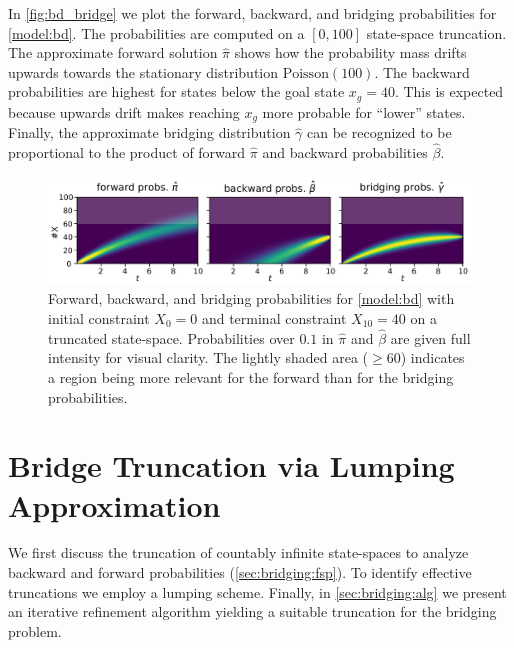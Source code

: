 \begin{example}
  In \autoref{fig:bd_bridge} we plot the forward, backward, and
  bridging probabilities for \autoref{model:bd}.
  The probabilities are computed on a $[0,100]$ state-space truncation.
  The approximate forward solution $\hat\pi$ shows how the
  probability mass drifts upwards towards the stationary distribution
  $\text{Poisson}(100)$. The backward probabilities are highest for
  states below the goal state $x_g=40$.
  This is expected because upwards drift makes reaching $x_g$ more
  probable for ``lower'' states.
  Finally, the approximate bridging distribution $\hat\gamma$ can be
  recognized to be proportional to the product of forward $\hat\pi$
  and backward probabilities $\hat\beta$.
  \begin{figure}[htb]
    \centering
    \includegraphics[width=\textwidth]{gfx/bridging_bd.pdf}
    \caption[Forward, backward, and bridging probabilities for
    \autoref{model:bd}]{Forward, backward, and bridging probabilities
      for \autoref{model:bd} with initial constraint $X_0=0$ and
      terminal constraint $X_{10}=40$ on a truncated state-space.
      Probabilities over $0.1$ in $\hat\pi$ and $\hat\beta$ are given
      full intensity for visual clarity. %
      The lightly shaded area ($\geq 60$) indicates a region being more
    relevant for the forward than for the bridging probabilities.}
    \label{fig:bd_bridge}
  \end{figure}
\end{example}

\section{Bridge Truncation via Lumping Approximation}\label{sec:bridging:method}
We first discuss the truncation of countably infinite state-spaces
to analyze backward and forward probabilities (\autoref{sec:bridging:fsp}).
To identify effective truncations we employ a lumping scheme.
Finally, in \autoref{sec:bridging:alg} we present an iterative
refinement algorithm
yielding a suitable truncation for the bridging problem.

